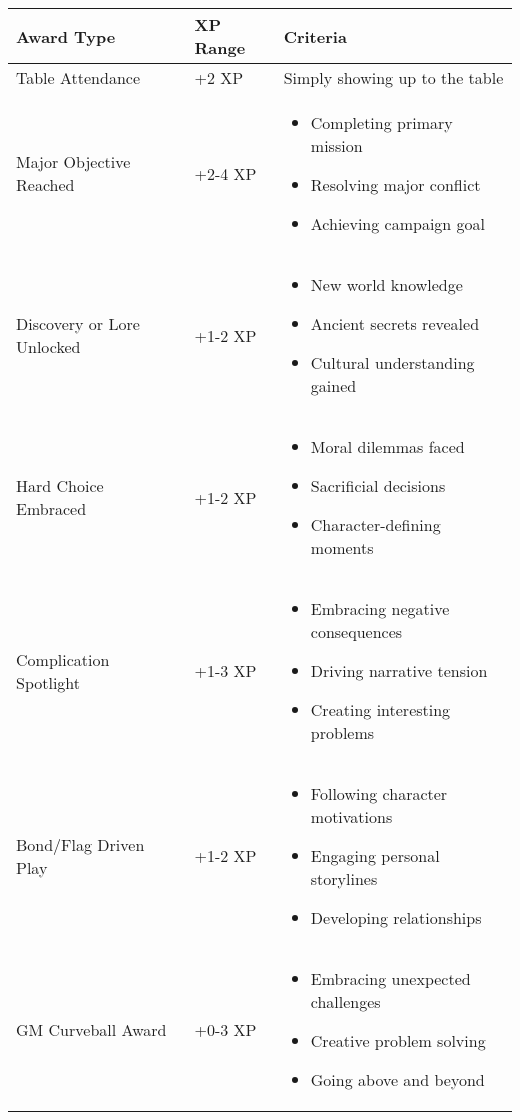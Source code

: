 \documentclass[11pt,letterpaper]{article}
\begin{document}
\begin{longtable}{|>{\raggedright\arraybackslash}p{4cm}|>{\raggedright\arraybackslash}p{3cm}|>{\raggedright\arraybackslash}p{5cm}|}
\hline
\textbf{Award Type} & \textbf{XP Range} & \textbf{Criteria} \\
\hline
Table Attendance & +2 XP & Simply showing up to the table \\
\hline
Major Objective Reached & +2-4 XP & 
\begin{itemize}
    \item Completing primary mission
    \item Resolving major conflict
    \item Achieving campaign goal
\end{itemize} \\
\hline
Discovery or Lore Unlocked & +1-2 XP & 
\begin{itemize}
    \item New world knowledge
    \item Ancient secrets revealed
    \item Cultural understanding gained
\end{itemize} \\
\hline
Hard Choice Embraced & +1-2 XP & 
\begin{itemize}
    \item Moral dilemmas faced
    \item Sacrificial decisions
    \item Character-defining moments
\end{itemize} \\
\hline
Complication Spotlight & +1-3 XP & 
\begin{itemize}
    \item Embracing negative consequences
    \item Driving narrative tension
    \item Creating interesting problems
\end{itemize} \\
\hline
Bond/Flag Driven Play & +1-2 XP & 
\begin{itemize}
    \item Following character motivations
    \item Engaging personal storylines
    \item Developing relationships
\end{itemize} \\
\hline
GM Curveball Award & +0-3 XP & 
\begin{itemize}
    \item Embracing unexpected challenges
    \item Creative problem solving
    \item Going above and beyond
\end{itemize} \\
\hline
\end{longtable}
\end{document}
